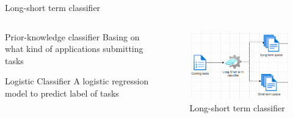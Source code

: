 \documentclass[10pt,xcolor={dvipsnames}, aspectratio=169]{beamer}
\begin{document}
\begin{frame}
{Long-short term classifier} 
	\begin{columns}[T] %
		\begin{column}{.48\textwidth}
			\begin{block}
			{Prior-knowledge classifier} 
			Basing on what kind of applications submitting tasks
			\end{block}
			\begin{block}
			{Logistic Classifier} 
			A logistic regression model to predict label of tasks
			\end{block}				
		\end{column}%
		\hfill%
		\begin{column}{.48\textwidth}
			\begin{figure}
				\centering
				\includegraphics[scale=0.5]{images/long_short_classifier.png}
				\caption{Long-short term classifier}
			\end{figure}
		\end{column}%
	\end{columns}
\end{frame}
\end{document}
